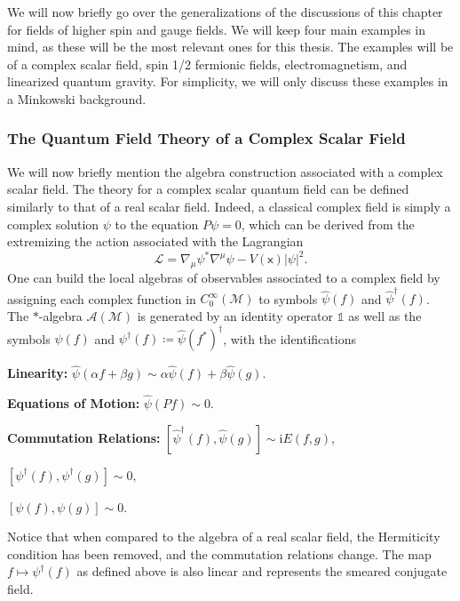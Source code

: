 \documentclass[letterpaper,12pt,titlepage,oneside,final]{book}
\newcommand{\openone}{\mathds{1}}
\newcommand{\M}{\mathcal{M}}
\newcommand{\mf}{\mathsf}%
\newcommand{\ii}{\mathrm{i}}
\begin{document}
We will now briefly go over the generalizations of the discussions of this chapter for fields of higher spin and gauge fields. We will keep four main examples in mind, as these will be the most relevant ones for this thesis. The examples will be of a complex scalar field, spin 1/2 fermionic fields, electromagnetism, and linearized quantum gravity. For simplicity, we will only discuss these examples in a Minkowski background.

\subsubsection*{The Quantum Field Theory of a Complex Scalar Field}

We will now briefly mention the algebra construction associated with a complex scalar field. The theory for a complex scalar quantum field can be defined similarly to that of a real scalar field. Indeed, a classical complex field is simply a complex solution $\psi$ to the equation $P\psi = 0$, which can be derived from the extremizing the action associated with the Lagrangian
\begin{equation}
    \mathcal{L} = \nabla_\mu \psi^* \nabla^\mu \psi - V(\mf x) |\psi|^2.
\end{equation}
One can build the local algebras of observables associated to a complex field by assigning each complex function in $C_0^\infty(\M)$ to symbols $\hat{\psi}(f)$ and $\hat{\psi}^\dagger(f)$. The $\ast$-algebra $\mathcal{A}(\M)$ is generated by an identity operator $\openone$ as well as the symbols $\psi(f)$ and $\psi^\dagger(f) \coloneqq \hat{\psi}(f^*)^\dagger$, with the identifications

\noindent \textbf{Linearity:} $\hat{\psi}(\alpha f + \beta g) \sim\alpha\hat{\psi}(f) + \beta \hat{\psi}(g)$.

\noindent \textbf{Equations of Motion:} $\hat{\psi}(Pf) \sim 0$.

\noindent \textbf{Commutation Relations:} $[\hat{\psi}^\dagger(f),\hat{\psi}(g)] \sim \ii E(f,g)$,

\:\:\:\:\:\:\:\:\:\:\:\:\:\:\:\:\:\:\:\:\:\:\:\:\:\:\:\:\:\:\:\:\:\:\:\:\:\:\:\:\:\:\:\:\:\:\:\:\:\:\:\noindent $[\psi^\dagger(f),\psi^\dagger(g)] \sim 0,$

\:\:\:\:\:\:\:\:\:\:\:\:\:\:\:\:\:\:\:\:\:\:\:\:\:\:\:\:\:\:\:\:\:\:\:\:\:\:\:\:\:\:\:\:\:\:\:\:\:\:\:\noindent $[\psi(f),\psi(g)] \sim 0.$

\noindent Notice that when compared to the algebra of a real scalar field, the Hermiticity condition has been removed, and the commutation relations change. The map $f\mapsto \psi^\dagger(f)$ as defined above is also linear and represents the smeared conjugate field.
\end{document}
